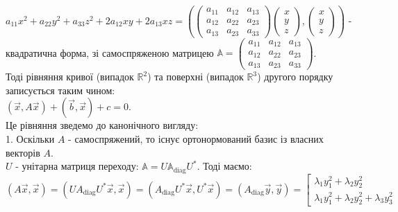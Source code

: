 \documentclass[a4paper, 10pt]{article}
\theoremstyle{theoremdd}
\theoremstyle{theoremdd}
\theoremstyle{theoremdd}
\theoremstyle{theoremdd}
\theoremstyle{theoremdd}
\theoremstyle{theoremdd}
\theoremstyle{theoremdd}
\theoremstyle{theoremdd}
\begin{document}
$a_{11}x^2 + a_{22}y^2 + a_{33}z^2 + 2a_{12}xy + 2a_{13}xz = \left(\begin{pmatrix}
a_{11} & a_{12} & a_{13} \\
a_{12} & a_{22} & a_{23} \\
a_{13} & a_{23} & a_{33}
\end{pmatrix} \begin{pmatrix}
x \\ y \\ z
\end{pmatrix}, \begin{pmatrix}
x \\ y \\ z
\end{pmatrix} \right)$ - квадратична форма, зі самоспряженою матрицею $\mathbb{A} = \begin{pmatrix}
a_{11} & a_{12} & a_{13} \\
a_{12} & a_{22} & a_{23} \\
a_{13} & a_{23} & a_{33}
\end{pmatrix}$.
\bigskip \\
Тоді рівняння кривої (випадок $\mathbb{R}^2$) та поверхні (випадок $\mathbb{R}^3$) другого порядку записується таким чином:\\
$(\vec{x}, A \vec{x}) + (\vec{b}, \vec{x}) + c = 0$.\\
Це рівняння зведемо до канонічного вигляду:\\
1. Оскільки $A$ - самоспряжений, то існує ортонормований базис із власних векторів $A$.\\
$U$ - унітарна матриця переходу: $\mathbb{A} = U \mathbb{A}_{\textrm{diag}} U^*$. Тоді маємо:\\
$(A\vec{x}, \vec{x}) = (U A_{\textrm{diag}} U^* \vec{x}, \vec{x}) = (A_{\textrm{diag}} U^* \vec{x}, U^* \vec{x}) = (A_{\textrm{diag}}\vec{y}, \vec{y}) = \left[ \begin{gathered} \lambda_1 y_1^2 + \lambda_2 y_2^2 \\
\lambda_1 y_1^2 + \lambda_2 y_2^2 + \lambda_3 y_3^2
 \end{gathered} \right.$
\end{document}
